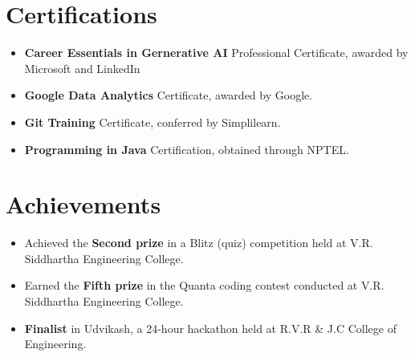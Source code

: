 \documentclass{article}
\begin{document}
\section*{Certifications}
\vspace{-1mm}
\begin{itemize}[leftmargin=*,itemsep = 0.4mm]
    \item \textbf{Career Essentials in Gernerative AI} Professional Certificate, awarded by Microsoft and LinkedIn
    \item \textbf{Google Data Analytics} Certificate, awarded by Google.
    \item \textbf{Git Training} Certificate, conferred by Simplilearn.
    \item \textbf{Programming in Java} Certification, obtained through NPTEL.
\end{itemize}
\vspace{2mm}
\hline
\vspace{-2mm}
\section*{Achievements}
\begin{itemize}[leftmargin=*,itemsep = 0.4mm]
    \item Achieved the \textbf{Second prize} in a Blitz (quiz) competition held at V.R. Siddhartha Engineering College.
    \item Earned the \textbf{Fifth prize} in the Quanta coding contest conducted at V.R. Siddhartha Engineering College.
    \item \textbf{Finalist} in Udvikash, a 24-hour hackathon held at R.V.R \& J.C College of Engineering.
\end{itemize}
\end{document}
